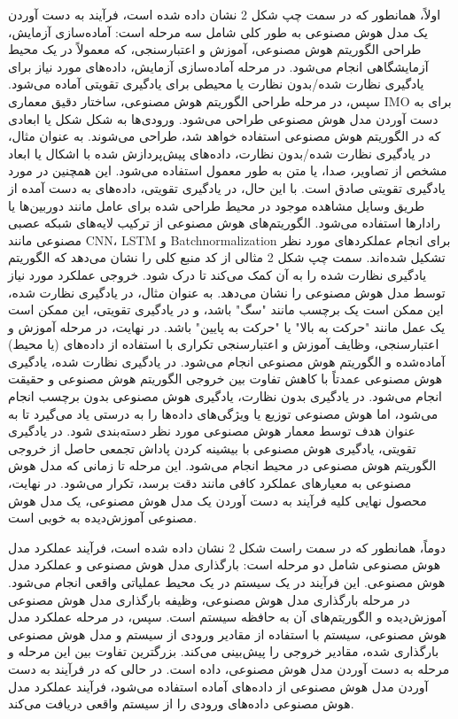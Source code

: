 \documentclass[a4paper,10pt]{article}
\begin{document}
                    اولاً، همانطور که در سمت چپ شکل 2 نشان داده شده است، فرآیند به دست آوردن یک مدل هوش مصنوعی به طور کلی شامل سه مرحله است: آماده‌سازی آزمایش، طراحی الگوریتم هوش مصنوعی، آموزش و اعتبارسنجی، که معمولاً در یک محیط آزمایشگاهی انجام می‌شود. در مرحله آماده‌سازی آزمایش، داده‌های مورد نیاز برای یادگیری نظارت شده/بدون نظارت یا محیطی برای یادگیری تقویتی آماده می‌شود. سپس، در مرحله طراحی الگوریتم هوش مصنوعی، ساختار دقیق معماری IMO برای به دست آوردن مدل هوش مصنوعی طراحی می‌شود. ورودی‌ها به شکل شکل یا ابعادی که در الگوریتم هوش مصنوعی استفاده خواهد شد، طراحی می‌شوند. به عنوان مثال، در یادگیری نظارت شده/بدون نظارت، داده‌های پیش‌پردازش شده با اشکال یا ابعاد مشخص از تصاویر، صدا، یا متن به طور معمول استفاده می‌شود. این همچنین در مورد یادگیری تقویتی صادق است. با این حال، در یادگیری تقویتی، داده‌های به دست آمده از طریق وسایل مشاهده موجود در محیط طراحی شده برای عامل مانند دوربین‌ها یا رادارها استفاده می‌شود. الگوریتم‌های هوش مصنوعی از ترکیب لایه‌های شبکه عصبی مصنوعی مانند CNN، LSTM و Batchnormalization برای انجام عملکردهای مورد نظر تشکیل شده‌اند. سمت چپ شکل 2 مثالی از کد منبع کلی را نشان می‌دهد که الگوریتم یادگیری نظارت شده را به آن کمک می‌کند تا درک شود. خروجی عملکرد مورد نیاز توسط مدل هوش مصنوعی را نشان می‌دهد. به عنوان مثال، در یادگیری نظارت شده، این ممکن است یک برچسب مانند "سگ" باشد، و در یادگیری تقویتی، این ممکن است یک عمل مانند "حرکت به بالا" یا "حرکت به پایین" باشد. در نهایت، در مرحله آموزش و اعتبارسنجی، وظایف آموزش و اعتبارسنجی تکراری با استفاده از داده‌های (یا محیط) آماده‌شده و الگوریتم هوش مصنوعی انجام می‌شود. در یادگیری نظارت شده، یادگیری هوش مصنوعی عمدتاً با کاهش تفاوت بین خروجی الگوریتم هوش مصنوعی و حقیقت انجام می‌شود. در یادگیری بدون نظارت، یادگیری هوش مصنوعی بدون برچسب انجام می‌شود، اما هوش مصنوعی توزیع یا ویژگی‌های داده‌ها را به درستی یاد می‌گیرد تا به عنوان هدف توسط معمار هوش مصنوعی مورد نظر دسته‌بندی شود. در یادگیری تقویتی، یادگیری هوش مصنوعی با بیشینه کردن پاداش تجمعی حاصل از خروجی الگوریتم هوش مصنوعی در محیط انجام می‌شود. این مرحله تا زمانی که مدل هوش مصنوعی به معیارهای عملکرد کافی مانند دقت برسد، تکرار می‌شود. در نهایت، محصول نهایی کلیه فرآیند به دست آوردن یک مدل هوش مصنوعی، یک مدل هوش مصنوعی آموزش‌دیده به خوبی است.

                    دوماً، همانطور که در سمت راست شکل 2 نشان داده شده است، فرآیند عملکرد مدل هوش مصنوعی شامل دو مرحله است: بارگذاری مدل هوش مصنوعی و عملکرد مدل هوش مصنوعی. این فرآیند در یک سیستم در یک محیط عملیاتی واقعی انجام می‌شود. در مرحله بارگذاری مدل هوش مصنوعی، وظیفه بارگذاری مدل هوش مصنوعی آموزش‌دیده و الگوریتم‌های آن به حافظه سیستم است. سپس، در مرحله عملکرد مدل هوش مصنوعی، سیستم با استفاده از مقادیر ورودی از سیستم و مدل هوش مصنوعی بارگذاری شده، مقادیر خروجی را پیش‌بینی می‌کند. بزرگترین تفاوت بین این مرحله و مرحله به دست آوردن مدل هوش مصنوعی، داده است. در حالی که در فرآیند به دست آوردن مدل هوش مصنوعی از داده‌های آماده استفاده می‌شود، فرآیند عملکرد مدل هوش مصنوعی داده‌های ورودی را از سیستم واقعی دریافت می‌کند.
\end{document}
